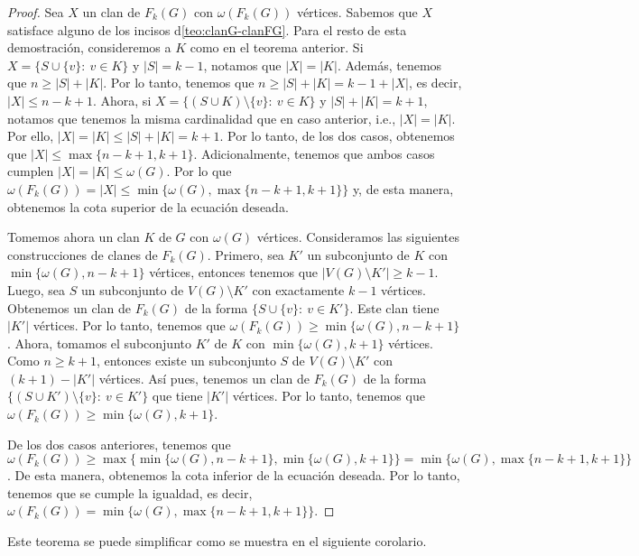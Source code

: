 \begin{proof}
    Sea $X$ un clan de $F_k(G)$ con $\omega(F_k(G))$ v\'ertices. Sabemos que $X$
    satisface alguno de los incisos d\cref{teo:clanG-clanFG}. Para el resto de
    esta demostraci\'on, consideremos a $K$ como en el teorema anterior.   Si $X
    = \{S \cup \{v\} \colon\ v \in K\}$ y $|S| = k-1$, notamos que $|X| = |K|$.
    Adem\'as, tenemos que $n \geq |S| + |K|$. Por lo tanto, tenemos que $n \geq
    |S| + |K| = k-1 + |X|$, es decir, $|X| \leq n-k+1$. Ahora, si $X = \{(S\cup
    K) \setminus \{v\} \colon\ v \in K \}$ y $|S| + |K| = k+1$, notamos que
    tenemos la misma cardinalidad que en caso anterior, i.e., $|X| =|K|$. Por
    ello, $|X| = |K| \leq |S| + |K| = k+1$. Por lo tanto, de los dos casos,
    obtenemos que $|X| \leq \max\{n-k+1, k+1\}$. Adicionalmente, tenemos que
    ambos casos cumplen $|X| = |K| \leq \omega(G)$. Por lo que $\omega(F_k(G)) =
    |X| \leq \min \{\omega(G), \max \{n-k+1, k+1\}\}$ y, de esta manera,
    obtenemos la cota superior de la ecuaci\'on deseada.

    Tomemos ahora un clan $K$ de $G$ con $\omega(G)$ v\'ertices. Consideramos
    las siguientes construcciones de clanes de $F_k(G)$. Primero, sea $K'$ un
    subconjunto de $K$ con $\min\{\omega(G),n-k+1\}$ v\'ertices, entonces
    tenemos que $|V(G) \setminus K'| \geq k-1$. Luego, sea $S$ un subconjunto de
    $V(G) \setminus K'$ con exactamente $k-1$ v\'ertices. Obtenemos un clan de
    $F_k(G)$ de la forma $\{ S \cup \{v\} \colon\ v \in K'\}$. Este clan tiene
    $|K'|$ v\'ertices. Por lo tanto, tenemos que $\omega(F_k(G)) \geq \min
    \{\omega(G), n-k+1\}$. Ahora, tomamos el subconjunto $K'$ de $K$ con $\min
    \{ \omega(G), k+1\}$ v\'ertices. Como $n \geq k+1$, entonces existe un
    subconjunto $S$ de $V(G) \setminus K'$ con $(k+1)-|K'|$ v\'ertices. As\'i
    pues, tenemos un clan de $F_k(G)$ de la forma $\{ (S \cup K') \setminus
    \{v\} \colon\ v \in K'\}$ que tiene $|K'|$ v\'ertices. Por lo tanto, tenemos
    que $\omega(F_k(G)) \geq \min \{\omega(G), k+1\}$.

    De los dos casos anteriores, tenemos que $\omega(F_k(G)) \geq \max \{\min
    \{\omega(G), n-k+1\}, \min \{\omega(G), k+1 \}\} = \min \{\omega(G), \max
    \{n-k+1,k+1\}\}$. De esta manera, obtenemos la cota inferior de la
    ecuaci\'on deseada. Por lo tanto, tenemos que se cumple la igualdad, es
    decir, $\omega(F_k(G))= \min \{\omega(G), \max \{n-k+1,k+1\}\}$.
\end{proof}

Este teorema se puede simplificar como se muestra en el siguiente corolario.

